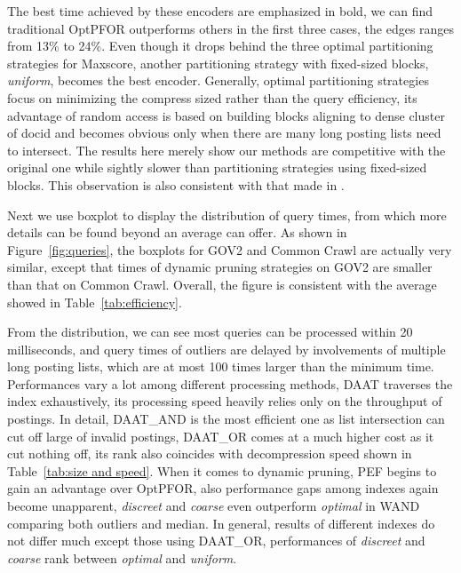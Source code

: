 \documentclass[runningheads]{comsis2}
\begin{document}
The best time achieved by these encoders are emphasized in bold, we can find traditional OptPFOR outperforms others in the first three cases, the edges ranges from 13\% to 24\%.
Even though it drops behind the three optimal partitioning strategies for Maxscore, another partitioning strategy with fixed-sized blocks, \textit{uniform}, becomes the best encoder.
Generally, optimal partitioning strategies focus on minimizing the compress sized rather than the query efficiency, its advantage of random access is based on building blocks aligning to dense cluster of docid and becomes obvious only when there are many long posting lists need to intersect.
The results here merely show our methods are competitive with the original one while sightly slower than partitioning strategies using fixed-sized blocks.
This observation is also consistent with that made in \cite{ottaviano2014partitioned}.

Next we use boxplot to display the distribution of query times, from which more details can be found beyond an average can offer.
As shown in Figure~\ref{fig:queries}, the boxplots for GOV2 and Common Crawl are actually very similar, except that times of dynamic pruning strategies on GOV2 are smaller than that on Common Crawl.
Overall, the figure is consistent with the average showed in Table~\ref{tab:efficiency}.

From the distribution, we can see most queries can be processed within 20 milliseconds, and query times of outliers are delayed by involvements of multiple long posting lists, which are at most 100 times larger than the minimum time.
Performances vary a lot among different processing methods, DAAT traverses the index exhaustively, its processing speed heavily relies only on the throughput of postings.
In detail, DAAT\_AND is the most efficient one as list intersection can cut off large of invalid postings, DAAT\_OR comes at a much higher cost as it cut nothing off, its rank also coincides with decompression speed shown in Table~\ref{tab:size and speed}.
When it comes to dynamic pruning, PEF begins to gain an advantage over OptPFOR, also performance gaps among indexes again become unapparent, \textit{discreet} and \textit{coarse} even outperform \textit{optimal} in WAND comparing both outliers and median.
In general, results of different indexes do not differ much except those using DAAT\_OR, performances of \textit{discreet} and \textit{coarse} rank between \textit{optimal} and \textit{uniform}.
\end{document}
